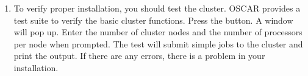 \begin {enumerate}

\item To verify proper installation, you should test the cluster.
  OSCAR provides a test suite to verify the basic cluster functions.
\begchange   Press the  button. A window will
    pop up. Enter the number of cluster nodes and the number of
      processors per node when prompted. The test will submit simple
      jobs to the cluster and print the output. If there are any
      errors, there is a problem in your installation.
 \endchange


\end{enumerate}
